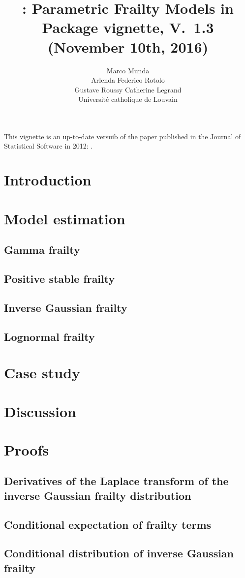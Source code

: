 \documentclass[nojss]{jss}
\author{Marco Munda\\Arlenda \And 
        Federico Rotolo\\Gustave Roussy \And
        Catherine Legrand\\Universit\'e catholique de Louvain}
\title{\pkg{parfm}: Parametric Frailty Models in \proglang{R}
        \\[.5em]\small{Package vignette, V.~1.3 (November 10th, 2016)}}
\begin{document}
This vignette is an up-to-date versuib of the paper
    published in the Journal of Statistical Software in 2012:
\cite{MundaEtal12}.

\section{Introduction}
  \label{sec:intro}
  

\section{Model estimation}
  \label{sec:model}
    
  \clearpage
  \subsection{Gamma frailty}
    \label{sec:model:gamma}
    
  \subsection{Positive stable frailty}
    \label{sec:model:PS}
    
  \subsection{Inverse Gaussian frailty}
    \label{sec:model:IG}
    
  \subsection{Lognormal frailty}
    \label{sec:model:LN}
    

\section{Case study}
  \label{sec:rexample}
  

\section{Discussion}
  \label{sec:concl}
  


% 


\clearpage
\appendix
\section{Proofs}
\subsection{Derivatives of the Laplace transform of the inverse Gaussian frailty distribution}
  \label{app:derLTIG}
  

\clearpage
\subsection{Conditional expectation of frailty terms}
  \label{app:condEfrailty}
  

\clearpage
\subsection{Conditional distribution of inverse Gaussian frailty}
  \label{app:condIG}
  
\end{document}
